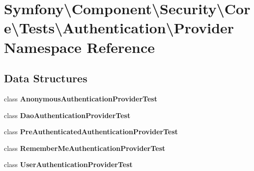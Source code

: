 \section{Symfony\textbackslash{}Component\textbackslash{}Security\textbackslash{}Core\textbackslash{}Tests\textbackslash{}Authentication\textbackslash{}Provider Namespace Reference}
\label{namespace_symfony_1_1_component_1_1_security_1_1_core_1_1_tests_1_1_authentication_1_1_provider}
\subsection*{Data Structures}
\begin{DoxyCompactItemize}
\item 
class {\bf Anonymous\+Authentication\+Provider\+Test}
\item 
class {\bf Dao\+Authentication\+Provider\+Test}
\item 
class {\bf Pre\+Authenticated\+Authentication\+Provider\+Test}
\item 
class {\bf Remember\+Me\+Authentication\+Provider\+Test}
\item 
class {\bf User\+Authentication\+Provider\+Test}
\end{DoxyCompactItemize}

